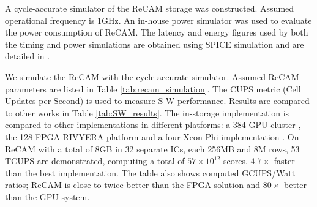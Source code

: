 \documentclass{superfri}
\begin{document}
	A cycle-accurate simulator of the ReCAM storage was constructed. Assumed operational frequency is 1GHz. An in-house power simulator was used to evaluate the power consumption of ReCAM. The latency and energy figures used by both the timing and power simulations are obtained using SPICE simulation and are detailed in \cite{yavits2015resistive}. 
	
	
	We simulate the ReCAM with the cycle-accurate simulator. Assumed ReCAM parameters are listed in Table \ref{tab:recam_simulation}. The CUPS metric (Cell Updates per Second) is used to measure S-W performance. Results are compared to other works in Table \ref{tab:SW_results}. The in-storage implementation is compared to other implementations in different platforms: a 384-GPU cluster \cite{de2016cudalign}, the 128-FPGA RIVYERA platform \cite{wienbrandt2014fpga} and a four Xeon Phi implementation \cite{liu2014swaphi}. On ReCAM with a total of 8GB in 32 separate ICs, each 256MB and 8M rows, 53 TCUPS are demonstrated, computing a total of  $57\times10^{12}$  scores. $4.7\times$ faster than the best implementation. The table also shows computed GCUPS/Watt ratios; ReCAM is close to twice better than the FPGA solution and $80\times$ better than the GPU system.
	
	
	
	
\end{document}
